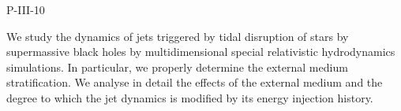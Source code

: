 P-III-10


\bigskip



\bigskip

\noindent We study the dynamics of jets triggered by tidal disruption of stars by supermassive black holes by multidimensional special relativistic hydrodynamics simulations. In particular, we properly determine the external medium stratification. We analyse in detail the effects of the external medium and the degree to which the jet dynamics is modified by its energy injection history.
